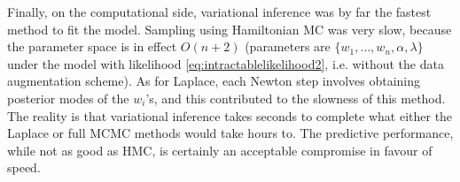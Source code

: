 Finally, on the computational side, variational inference was by far the fastest method to fit the model.
Sampling using Hamiltonian MC was very slow, because the parameter space is in effect $O(n + 2)$ (parameters are $\{w_1,\dots,w_n,\alpha,\lambda\}$ under the model with likelihood \cref{eq:intractablelikelihood2}, i.e. without the data augmentation scheme).
As for Laplace, each Newton step involves obtaining posterior modes of the $w_i$'s, and this contributed to the slowness of this method.
The reality is that variational inference takes seconds to complete what either the Laplace or full MCMC methods would take hours to.
The predictive performance, while not as good as HMC, is certainly an acceptable compromise in favour of speed.
\vspace{-1em}
